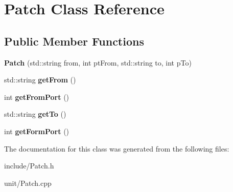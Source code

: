 \hypertarget{classPatch}{\section{Patch Class Reference}
\label{classPatch}
}
\subsection*{Public Member Functions}
\begin{DoxyCompactItemize}
\item 
\hypertarget{classPatch_a5ff9de0f83c44aa11aae837870aa55f0}{{\bfseries Patch} (std\-::string from, int pt\-From, std\-::string to, int p\-To)}\label{classPatch_a5ff9de0f83c44aa11aae837870aa55f0}

\item 
\hypertarget{classPatch_a97b08ef9e08c5ef8b5d71692a7242796}{std\-::string {\bfseries get\-From} ()}\label{classPatch_a97b08ef9e08c5ef8b5d71692a7242796}

\item 
\hypertarget{classPatch_a365988c401459bfd0f0b5b21f041bfe1}{int {\bfseries get\-From\-Port} ()}\label{classPatch_a365988c401459bfd0f0b5b21f041bfe1}

\item 
\hypertarget{classPatch_ade1fb3107faa8224f29c4a8387821fee}{std\-::string {\bfseries get\-To} ()}\label{classPatch_ade1fb3107faa8224f29c4a8387821fee}

\item 
\hypertarget{classPatch_a19e489d67f86b80ac5f0ef774a3b87c8}{int {\bfseries get\-Form\-Port} ()}\label{classPatch_a19e489d67f86b80ac5f0ef774a3b87c8}

\end{DoxyCompactItemize}


The documentation for this class was generated from the following files\-:\begin{DoxyCompactItemize}
\item 
include/Patch.\-h\item 
unit/Patch.\-cpp\end{DoxyCompactItemize}

